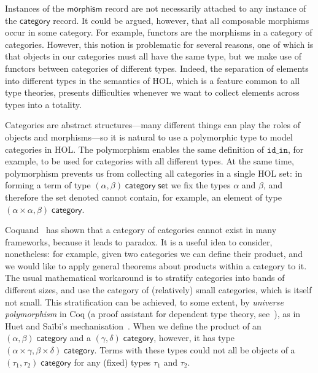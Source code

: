 \documentclass[twoside,titlepage,11pt]{article}
\begin{document}
Instances of the $\mathsf{morphism}$ record are not necessarily attached to any instance of the $\mathsf{category}$ record.
It could be argued, however, that all composable morphisms occur in some category.
For example, functors are the morphisms in a category of categories.
However, this notion is problematic for several reasons, one of which is that objects in our categories must all have the same type, but we make use of functors between categories of different types.
Indeed, the separation of elements into different types in the semantics of HOL, which is a feature common to all type theories, presents difficulties whenever we want to collect elements across types into a totality.

Categories are abstract structures---many different things can play the roles of objects and morphisms---so it is natural to use a polymorphic type to model categories in HOL.
The polymorphism enables the same definition of $\mathtt{id\_in}$, for example, to be used for categories with all different types.
At the same time, polymorphism prevents us from collecting all categories in a single HOL set: in forming a term of type $(\alpha,\beta)\;\mathsf{category}\;\mathsf{set}$ we fix the types $\alpha$ and $\beta$, and therefore the set denoted cannot contain, for example, an element of type $(\alpha\times\alpha,\beta)\;\mathsf{category}$.

Coquand~\cite{DBLP:conf/lics/Coquand86} has shown that a category of categories cannot exist in many frameworks, because it leads to paradox.
It is a useful idea to consider, nonetheless: for example, given two categories we can define their product, and we would like to apply general theorems about products within a category to it.
The usual mathematical workaround is to stratify categories into bands of different sizes, and use the category of (relatively) small categories, which is itself not small.
This stratification can be achieved, to some extent, by \emph{universe polymorphism} in Coq (a proof assistant for dependent type theory, see~\cite{DBLP:conf/tphol/Bertot08}), as in Huet and Sa{\"i}bi's mechanisation~\cite{DBLP:conf/birthday/HuetS00}.
When we define the product of an $(\alpha,\beta)\;\mathsf{category}$ and a $(\gamma,\delta)\;\mathsf{category}$, however, it has type $(\alpha\times\gamma,\beta\times\delta)\;\mathsf{category}$.
Terms with these types could not all be objects of a $(\tau_1,\tau_2)\;\mathsf{category}$ for any (fixed) types $\tau_1$ and $\tau_2$.
\end{document}
